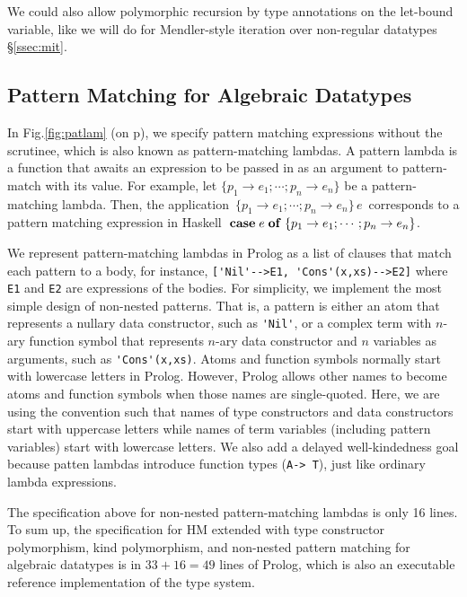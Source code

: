\documentclass[runningheads,a4paper]{llncs}
\begin{document}
We could also allow polymorphic recursion by type annotations
on the let-bound variable, like we will do for Mendler-style iteration
over non-regular datatypes \S\ref{ssec:mit}.


\subsection{Pattern Matching for Algebraic Datatypes}\label{ssec:patlam}
In Fig.\ref{fig:patlam} (on p\pageref{fig:patlam}), we specify
pattern matching expressions without the scrutinee, which is
also known as pattern-matching lambdas. A pattern lambda is
a function that awaits an expression to be passed in
as an argument to pattern-match with its value. For example,
let $\{p_1\to e_1;\cdots; p_n\to e_n\}$ be a pattern-matching lambda.
Then, the application $\,\{p_1\to e_1;\cdots; p_n\to e_n\}\,e\,$
corresponds to a pattern matching expression in Haskell
${\bf\;case}\;e\;{\bf of}\;\{p_1\to e_1;\cdots; p_n\to e_n\}$.

We represent pattern-matching lambdas in Prolog as a list of clauses
that match each pattern to a body, for instance,
\verb|['Nil'-->E1, 'Cons'(x,xs)-->E2]|
where \verb|E1| and \verb|E2| are expressions of the bodies. For simplicity,
we implement the most simple design of non-nested patterns. That is,
a pattern is either an atom that represents a nullary data constructor,
such as \verb|'Nil'|, or a complex term with $n$-ary function symbol
that represents $n$-ary data constructor and $n$ variables as arguments,
such as \verb|'Cons'(x,xs)|.
Atoms and function symbols normally start with lowercase letters in Prolog.
However, Prolog allows other names to become atoms and function symbols
when those names are single-quoted. Here, we are using the convention
such that names of type constructors and data constructors start with 
uppercase letters while names of term variables (including pattern variables)
start with lowercase letters. We also add a delayed well-kindedness goal
because patten lambdas introduce function types (\verb|A-> T|), just like
ordinary lambda expressions.

The specification above for non-nested pattern-matching lambdas
is only 16 lines. To sum up, the specification for HM extended
with type constructor polymorphism, kind polymorphism, and
non-nested pattern matching for algebraic datatypes is in $33+16=49$
lines of Prolog, which is also an executable reference implementation
of the type system.
\end{document}
